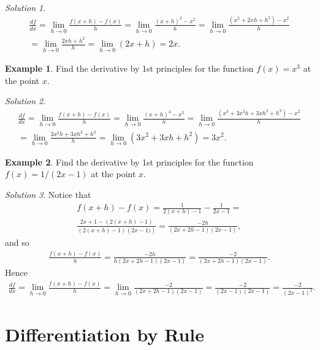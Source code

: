 \documentclass[
  11pt,
  oneside]{book}
\newcommand{\slide}{}
\theoremstyle{definition}
\theoremstyle{definition}
\newtheorem{example}{Example}[chapter]
\theoremstyle{definition}
\theoremstyle{definition}
\theoremstyle{remark}
\newtheorem*{solution}{Solution}
\begin{document}
\begin{solution}
\begin{gather*}
\frac{df}{dx} = \lim\limits_{h\to0}\frac{f(x+h)-f(x)}{h} = \lim\limits_{h\to0}\frac{(x+h)^2 - x^2}{h} = \lim\limits_{h\to0}\frac{(x^2+2xh+h^2)-x^2}{h}\\ = \lim\limits_{h\to0}\frac{2xh+h^2}{h} = \lim\limits_{h\to0}(2x+h) = 2x.
\end{gather*}
\end{solution}

\begin{example}
Find the derivative by 1st principles for the function \(f(x) = x^3\) at the point \(x\).
\end{example}

\begin{solution}
\begin{gather*}
\frac{df}{dx} = \lim\limits_{h\to0}\frac{f(x+h)-f(x)}{h} = \lim\limits_{h\to0}\frac{(x+h)^3 - x^3}{h} = \lim\limits_{h\to0}\frac{(x^3+3x^2h+3xh^2+h^3)-x^2}{h}\\ = \lim\limits_{h\to0}\frac{3x^2h+3xh^2+h^3}{h} = \lim\limits_{h\to0}(3x^2+3xh+h^2) = 3x^2.
\end{gather*}
\end{solution}

\slide

\begin{example}
Find the derivative by 1st principles for the function \(f(x) = 1/(2x-1)\) at the point \(x\).
\end{example}

\begin{solution}
Notice that
\begin{gather*}
f(x+h)-f(x) = \frac{1}{2(x+h)-1} - \frac{1}{2x-1} =\\ \frac{2x+1-\left(2(x+h)-1\right)}{\left(2(x+h)-1\right)\left(2x-1)\right)} = \frac{-2h}{(2x+2h-1)(2x-1)},
\end{gather*}
and so
\begin{gather*}
\frac{f(x+h)-f(x)}{h} = \frac{-2h}{h(2x+2h-1)(2x-1)} = \frac{-2}{(2x+2h-1)(2x-1)}.
\end{gather*}
Hence
\begin{gather*}
\frac{df}{dx} = \lim\limits_{h\to0}\frac{f(x+h)-f(x)}{h} = \lim\limits_{h\to0}\frac{-2}{(2x+2h-1)(2x-1)} = \frac{-2}{(2x-1)(2x-1)} = \frac{-2}{(2x-1)^2}.
\end{gather*}
\end{solution}

\section{Differentiation by Rule}\label{lecture-three}
\end{document}

